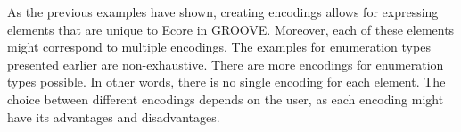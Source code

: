 As the previous examples have shown, creating encodings allows for expressing elements that are unique to Ecore in GROOVE. Moreover, each of these elements might correspond to multiple encodings. The examples for enumeration types presented earlier are non-exhaustive. There are more encodings for enumeration types possible. In other words, there is no single encoding for each element. The choice between different encodings depends on the user, as each encoding might have its advantages and disadvantages.